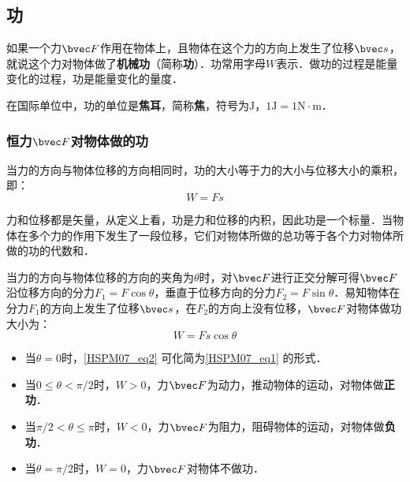 
\begin{issues}
\issueDraft
\issueTODO
\end{issues}

\subsection{功}

如果一个力$\bvec F$作用在物体上，且物体在这个力的方向上发生了位移$\bvec s$，就说这个力对物体做了\textbf{机械功}（简称\textbf{功}）．功常用字母$W$表示．做功的过程是能量变化的过程，功是能量变化的量度．

在国际单位中，功的单位是\textbf{焦耳}，简称\textbf{焦}，符号为$\mathrm{J}$，$1\mathrm{J}=1\mathrm{N \cdot m}$．

\subsubsection{恒力$\bvec F$对物体做的功}

当力的方向与物体位移的方向相同时，功的大小等于力的大小与位移大小的乘积，即：
\begin{equation}\label{HSPM07_eq1}
W=Fs
\end{equation}

力和位移都是矢量，从定义上看，功是力和位移的内积，因此功是一个标量．当物体在多个力的作用下发生了一段位移，它们对物体所做的总功等于各个力对物体所做的功的代数和．

当力的方向与物体位移的方向的夹角为$\theta$时，对$\bvec F$进行正交分解可得$\bvec F$沿位移方向的分力$F_1=F\cos \theta$，垂直于位移方向的分力$F_2=F\sin \theta$．易知物体在分力$F_1$的方向上发生了位移$\bvec s$，在$F_2$的方向上没有位移，$\bvec F$对物体做功大小为：
\begin{equation}\label{HSPM07_eq2}
W=Fs\cos \theta
\end{equation}

\begin{itemize}
\item 当$\theta = 0$时，\autoref{HSPM07_eq2} 可化简为\autoref{HSPM07_eq1} 的形式．
\item 当$0\leq \theta < \pi/2$时，$W>0$，力$\bvec F$为动力，推动物体的运动，对物体做\textbf{正功}．
\item 当$\pi/2< \theta \leq \pi$时，$W<0$，力$\bvec F$为阻力，阻碍物体的运动，对物体做\textbf{负功}．
\item 当$\theta = \pi/2$时，$W=0$，力$\bvec F$对物体不做功．
\end{itemize}

